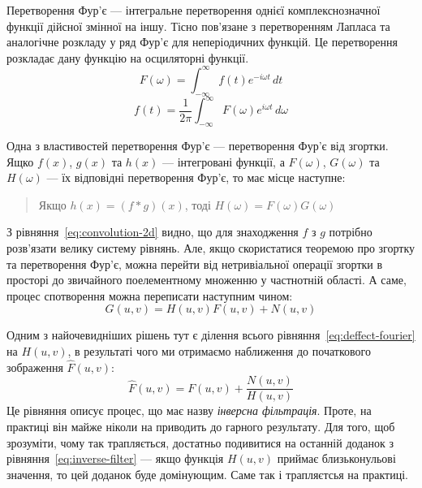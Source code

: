 \documentclass[simple,14pt,utf8,ukrainian]{eskdtext}
\begin{document}
Перетворення Фур’є --- інтегральне перетворення однієї комплекснозначної
функції дійсної змінної на іншу.
Тісно пов’язане з перетворенням Лапласа та аналогічне розкладу у ряд Фур’є для
неперіодичних функцій.
Це перетворення розкладає дану функцію на осциляторні функції.
\begin{equation}
  F\left( \omega \right) = \int_{-\infty}^\infty f\left( t \right) e^{-i
  \omega t }\,dt
  \label{eq:fourier-def}
\end{equation}
\begin{equation}
  f\left( t \right) = \frac{1}{2 \pi} \int_{-\infty}^\infty F\left( \omega
  \right) e^{i \omega t}\, d\omega
  \label{eq:invfourier-def}
\end{equation}

Одна з властивостей перетворення Фур’є --- перетворення Фур’є від згортки.
Ящко $f\left( x \right)$, $g\left( x \right)$ та $h\left( x \right)$ ---
інтегровані функції, а $F\left( \omega \right)$, $G\left( \omega \right)$ та
$H\left( \omega \right)$ --- їх відповідні перетворення Фур’є, то має місце
наступне:
\begin{quote}
  Якщо $h\left( x \right) = \left( f \ast g \right)\left( x \right)$, тоді
  $H\left( \omega \right) = F\left( \omega \right) G\left( \omega \right)$
\end{quote}
З рівняння~\eqref{eq:convolution-2d} видно, що для знаходження $f$ з $g$
потрібно розв’язати велику систему рівнянь.
Але, якщо скористатися теоремою про згортку та перетворення Фур’є, можна
перейти від нетривіальної операції згортки в просторі до звичайного
поелементному множенню у частнотній області.
А саме, процес спотворення можна переписати наступним чином:
\begin{equation}
  G\left( u, v \right) = H\left( u, v \right) F\left( u, v \right) + N\left(
  u, v \right)
  \label{eq:deffect-fourier}
\end{equation}

Одним з найочевидніших рішень тут є ділення всього
рівняння~\eqref{eq:deffect-fourier} на $H\left( u, v \right)$, в результаті
чого ми отримаємо наближення до початкового зображення $\hat{F}\left( u, v
\right)$:
\begin{equation}
  \hat{F}\left( u, v \right) = F\left( u, v \right) + \frac{N\left( u, v
  \right)}{H\left( u, v \right)}
  \label{eq:inverse-filter}
\end{equation}
Це рівняння описує процес, що має назву \emph{інверсна фільтрація}.
Проте, на практиці він майже ніколи на приводить до гарного результату.
Для того, щоб зрозуміти, чому так трапляється, достатньо подивитися на
останній доданок з рівняння~\eqref{eq:inverse-filter} --- якщо функція $H\left(
u, v \right)$ приймає близьконульові значення, то цей доданок буде домінующим.
Саме так і трапляєтсья на практиці.
\end{document}
